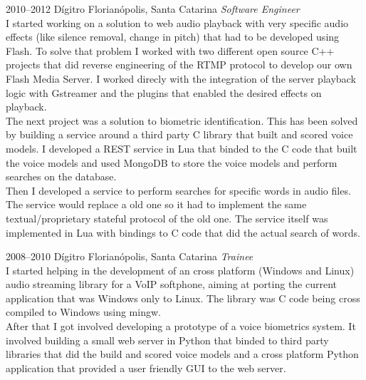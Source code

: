 \documentclass[]{friggeri-cv} %
\begin{document}
\begin{entrylist}
\entry
{2010--2012}
{Dígitro}
{Florianópolis, Santa Catarina}
{\emph{Software Engineer} \\

I started working on a solution to web audio playback
with very specific audio effects (like silence removal,
change in pitch) that had to be developed using Flash.
To solve that problem I worked with
two different open source C++ projects that did reverse
engineering of the RTMP protocol to develop our own
Flash Media Server. I worked direcly with the integration
of the server playback logic with Gstreamer and the plugins
that enabled the desired effects on playback. \\

The next project was a solution to biometric identification.
This has been solved by building a service around a third party
C library that built and scored voice models.
I developed a REST service in Lua that binded to the C code
that built the voice models and used MongoDB to store the
voice models and perform searches on the database. \\

Then I developed a service to perform searches for specific
words in audio files. The service would replace a old one so
it had to implement the same textual/proprietary stateful protocol
of the old one. The service itself was implemented in Lua
with bindings to C code that did the actual search of
words. \\

}
\end{entrylist}
\begin{entrylist}
\entry
{2008--2010}
{Dígitro}
{Florianópolis, Santa Catarina}
{\emph{Trainee} \\

I started helping in the development of an
cross platform (Windows and Linux) audio streaming
library for a VoIP softphone, aiming at porting
the current application that was Windows only to Linux.
The library was C code being cross compiled to Windows using mingw.\\

After that I got involved developing a prototype of a voice
biometrics system. It involved building a small web server
in Python that binded to third party libraries that did
the build and scored voice models and a cross platform
Python application that provided a user friendly GUI
to the web server.
}
\end{entrylist}
\end{document}
